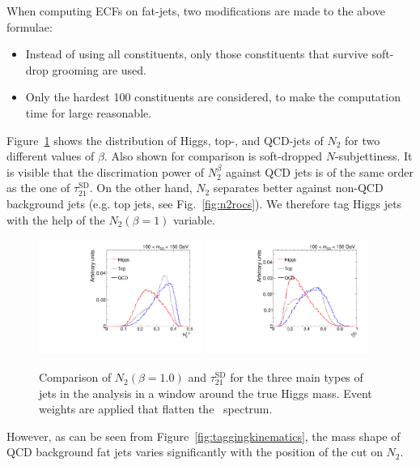When computing ECFs on fat-jets, two modifications are made to the above formulae:
\begin{itemize}
  \item Instead of using all constituents, only those constituents that survive soft-drop grooming are used.
  \item Only the hardest 100 constituents are considered, to make the computation time for large reasonable.
\end{itemize}


Figure~\ref{fig:n2tau21} shows the distribution of Higgs, top-, and QCD-jets of $N_2$ for two different values of $\beta$. Also shown for comparison is soft-dropped $N$-subjettiness. It is visible that the discrimation power of $N_2^\beta$ against QCD jets  is of the same order as the one of $\tau_{21}^{\text{SD}}$. On the other hand, $N_2$ separates better against non-QCD background jets (e.g. top jets, see Fig.~\ref{fig:n2rocs}). We therefore tag Higgs jets with the help of the $N_2(\beta=1)$ variable.

\begin{figure}
  \centering
  \includegraphics[width=0.475\textwidth]{figures/higgstagging/n2ddt/ddt_N2_10_ns.pdf}
  \includegraphics[width=0.475\textwidth]{figures/higgstagging/n2ddt/ddt_tau21SD_ns.pdf}
  \caption{Comparison of $N_2(\beta=1.0)$ and $\tau_{21}^\text{SD}$ for the three main types of jets in the analysis in a window around the true Higgs mass. Event weights are applied that flatten the \pt~spectrum.}
  \label{fig:n2tau21}
\end{figure}


However, as can be seen from Figure~\ref{fig:taggingkinematics}, the mass shape of QCD background fat jets varies significantly with the position of the cut on $N_2$. 

